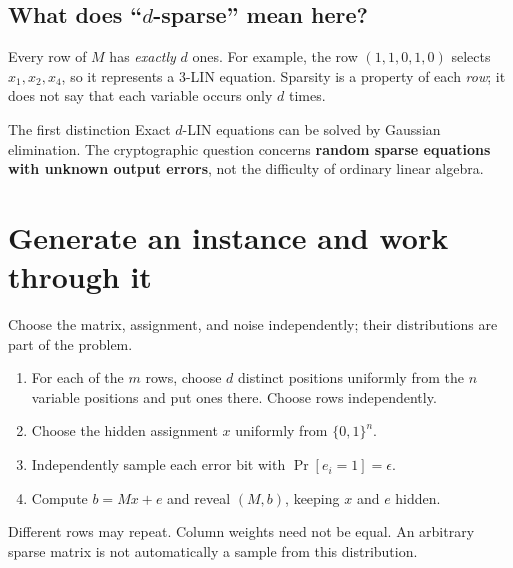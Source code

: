 \documentclass[11pt,a4paper]{article}
\begin{document}
\subsection*{What does ``$d$-sparse'' mean here?}
Every row of $M$ has \emph{exactly} $d$ ones. For example, the row $(1,1,0,1,0)$ selects $x_1,x_2,x_4$, so it represents a 3-LIN equation. Sparsity is a property of each \emph{row}; it does not say that each variable occurs only $d$ times.

\begin{keyidea}{The first distinction}
Exact $d$-LIN equations can be solved by Gaussian elimination. The cryptographic question concerns \textbf{random sparse equations with unknown output errors}, not the difficulty of ordinary linear algebra.
\end{keyidea}

\newpage
\section{Generate an instance and work through it}
Choose the matrix, assignment, and noise independently; their distributions are part of the problem.~\cite{draft2}
\begin{enumerate}
\item For each of the $m$ rows, choose $d$ distinct positions uniformly from the $n$ variable positions and put ones there. Choose rows independently.
\item Choose the hidden assignment $x$ uniformly from $\{0,1\}^n$.
\item Independently sample each error bit with $\Pr[e_i=1]=\epsilon$.
\item Compute $b=Mx+e$ and reveal $(M,b)$, keeping $x$ and $e$ hidden.
\end{enumerate}
Different rows may repeat. Column weights need not be equal. An arbitrary sparse matrix is not automatically a sample from this distribution.
\end{document}

